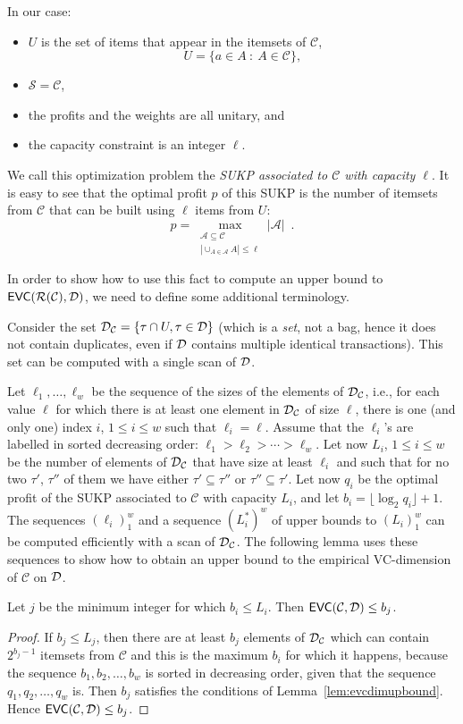 In our case:
\begin{itemize}
	\item $U$ is the set of items that appear in the itemsets of $\mathcal{C}$,
		\[
			U=\{a\in A ~:~ A\in\mathcal{C}\},
		\]
	\item $\mathcal{S}=\mathcal{C}$,
	\item the profits and the weights are all unitary, and
	\item the capacity constraint is an integer $\ell$.
\end{itemize}
We call this optimization problem the \emph{SUKP associated to $\mathcal{C}$
with capacity $\ell$}. It is easy to see that the optimal profit $p$ of this
SUKP is the number of itemsets from $\mathcal{C}$ that can be built using $\ell$
items from $U$:
\[
	p=\max_{\substack{\mathcal{A}\subseteq\mathcal{C}\\ |\cup_{A\in\mathcal{A}}
A|\le\ell}} |\mathcal{A}|\enspace.
\]

In order to show how to use this fact to compute an upper bound to
$\mathsf{EVC}(\mathcal{R}(\mathcal{C}),{\cal D})$, we need to define some additional terminology.

Consider the set ${\cal D}_\mathcal{C} = \{ \tau \cap U, \tau\in {\cal D}\}$ (which is a
\emph{set}, not a bag, hence it does not contain duplicates, even if ${\cal D}$
contains multiple identical transactions). This set can be computed with a
single scan of ${\cal D}$.

Let $\ell_1,\dotsc,\ell_w$ be the sequence of the sizes of the elements of
${\cal D}_\mathcal{C}$, i.e., for each value $\ell$ for which there is at least one
element in ${\cal D}_\mathcal{C}$ of size $\ell$, there is one (and only one) index
$i$, $1\le i\le w$ such that $\ell_i=\ell$. Assume that the $\ell_i$'s are
labelled in sorted decreasing order: $\ell_1>\ell_2>\dotsb>\ell_w$. Let now
$L_i$, $1\le i\le w$ be the number of elements of ${\cal D}_\mathcal{C}$ that have
size at least $\ell_i$ and such that for no two $\tau'$, $\tau''$ of them we
have either $\tau'\subseteq\tau''$ or $\tau''\subseteq\tau'$. Let now $q_i$ be
the optimal profit of the SUKP associated to $\mathcal{C}$ with capacity $L_i$,
and let $b_i=\lfloor \log_2q_i\rfloor +1$. The sequences $(\ell_i)_1^w$ and a
sequence $(L_i^*)^w$ of upper bounds to $(L_i)_1^w$ can be computed efficiently
with a scan of ${\cal D}_\mathcal{C}$. The following lemma uses these sequences to
show how to obtain an upper bound to the empirical VC-dimension of $\mathcal{C}$
on ${\cal D}$.

\begin{lemma}\label{lem:sukpevc}
  Let $j$ be the minimum integer for which $b_i\le L_i$. Then
  $\mathsf{EVC}(\mathcal{C},{\cal D})\le b_j$.
\end{lemma}
\begin{proof}
  If $b_j\le L_j$, then there are at least $b_j$ elements of ${\cal D}_\mathcal{C}$
  which can contain $2^{b_j-1}$ itemsets from $\mathcal{C}$ and this is the
  maximum $b_i$ for which it happens, because the sequence $b_1,b_2,\dotsc,b_w$
  is sorted in decreasing order, given that the sequence $q_1,q_2,\dotsc,q_w$
  is. Then $b_j$ satisfies the conditions of Lemma~\ref{lem:evcdimupbound}.
  Hence $\mathsf{EVC}(\mathcal{C},{\cal D})\le b_j$.
\end{proof}

